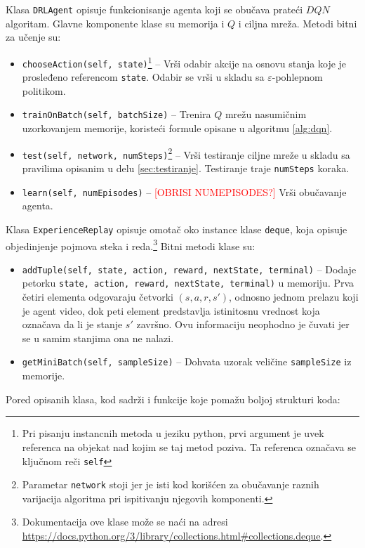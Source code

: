 \par 
Klasa \texttt{DRLAgent} opisuje funkcionisanje agenta koji se obučava prateći $DQN$ algoritam. Glavne komponente klase su memorija i $Q$ i ciljna mreža. Metodi bitni za učenje su:
\begin{itemize}
	\item \texttt{chooseAction(self, state)}\footnote{Pri pisanju instancnih metoda u jeziku python, prvi argument je uvek referenca na objekat nad kojim se taj metod poziva. Ta referenca označava se ključnom reči \texttt{self}} -- Vrši odabir akcije na osnovu stanja koje je prosleđeno referencom \texttt{state}. Odabir se vrši u skladu sa $\varepsilon$-pohlepnom politikom.
	\item \texttt{trainOnBatch(self, batchSize)} -- Trenira $Q$ mrežu nasumičnim uzorkovanjem memorije, koristeći formule opisane u algoritmu \ref{alg:dqn}.
	\item \texttt{test(self, network, numSteps)}\footnote{Parametar \texttt{network} stoji jer je isti kod korišćen za obučavanje raznih varijacija algoritma pri ispitivanju njegovih komponenti.} -- Vrši testiranje ciljne mreže u skladu sa pravilima opisanim u delu \ref{sec:testiranje}. Testiranje traje \texttt{numSteps} koraka.
	\item \texttt{learn(self, numEpisodes)} -- \textcolor{red}{[OBRISI NUMEPISODES?]} Vrši obučavanje agenta. 
\end{itemize}
\par 
Klasa \texttt{ExperienceReplay} opisuje omotač oko instance klase \texttt{deque}, koja opisuje objedinjenje pojmova steka i reda.\footnote{Dokumentacija ove klase može se naći na adresi \url{https://docs.python.org/3/library/collections.html\#collections.deque}.} Bitni metodi klase su:
\begin{itemize}
	\item \texttt{addTuple(self, state, action, reward, nextState, terminal)} -- Dodaje petorku \texttt{state, action, reward, nextState, terminal)} u memoriju. Prva četiri elementa odgovaraju četvorki $(s, a, r, s')$, odnosno jednom prelazu koji je agent video, dok peti element predstavlja istinitosnu vrednost koja označava da li je stanje $s'$ završno. Ovu informaciju neophodno je čuvati jer se u samim stanjima ona ne nalazi.
	\item \texttt{getMiniBatch(self, sampleSize)} -- Dohvata uzorak veličine \texttt{sampleSize} iz memorije.
\end{itemize}
\par 
Pored opisanih klasa, kod sadrži i funkcije koje pomažu boljoj strukturi koda:

